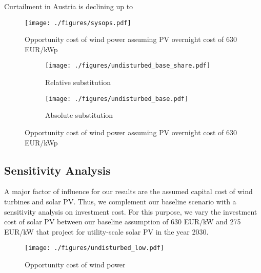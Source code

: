 \documentclass[final, 3p, times]{elsarticle} %
\begin{document}
    Curtailment in Austria is declining up to

    \begin{figure*}
        \centering
        \texttt{[image: ./figures/sysops.pdf]}
        \caption{Opportunity cost of wind power assuming PV overnight cost of 630 EUR/kWp}
        \label{figure:system-operation-base}
    \end{figure*}




    \begin{figure*}
        \centering
        \begin{subfigure}[b]{0.475\textwidth}
            \centering
            \texttt{[image: ./figures/undisturbed\_base\_share.pdf]}
            \caption{Relative substitution}
            \label{fig:rel_substitution}
        \end{subfigure}
        \hfill
        \begin{subfigure}[b]{0.475\textwidth}
            \centering
            \texttt{[image: ./figures/undisturbed\_base.pdf]}
            \caption{Absolute substitution}
            \label{fig::abs_substitution}
        \end{subfigure}
        \caption{Opportunity cost of wind power assuming PV overnight cost of 630 EUR/kWp}
        \label{figure:opportunity-cost-base}
    \end{figure*}

    \subsection{Sensitivity Analysis} \label{subsec:sensitivity}
    A major factor of influence for our results are the assumed capital cost of wind turbines and solar PV.
    Thus, we complement our baseline scenario with a sensitivity analysis on investment cost.
    For this purpose, we vary the investment cost of solar PV between our baseline assumption of 630 EUR/kW and 275
    EUR/kW that \cite{Vartiainen2019} project for utility-scale solar PV in the year 2030.

    \begin{figure*}
        \centering
        \texttt{[image: ./figures/undisturbed\_low.pdf]}
        \caption{Opportunity cost of wind power}
    \end{figure*}
\end{document}
